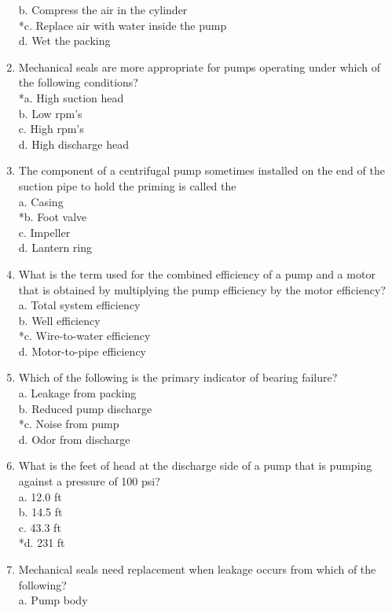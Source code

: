 \begin{enumerate}[1.]
b. Compress the air in the cylinder\\
*c. Replace air with water inside the pump\\
d. Wet the packing\\
\item Mechanical seals are more appropriate for pumps operating under which of the following conditions?\\
*a. High suction head\\
b. Low rpm's\\
c. High rpm's\\
d. High discharge head\\
\item The component of a centrifugal pump sometimes installed on the end of the suction pipe to hold the priming is called the\\
a. Casing\\
*b. Foot valve\\
c. Impeller\\
d. Lantern ring\\
\item What is the term used for the combined efficiency of a pump and a motor that is obtained by multiplying the pump efficiency by the motor efficiency?\\
a. Total system efficiency\\
b. Well efficiency\\
*c. Wire-to-water efficiency\\
d. Motor-to-pipe efficiency\\
\item Which of the following is the primary indicator of bearing failure?\\
a. Leakage from packing\\
b. Reduced pump discharge\\
*c. Noise from pump\\
d. Odor from discharge\\
\item What is the feet of head at the discharge side of a pump that is pumping against a pressure of 100 psi?\\
a. 12.0 ft\\
b. 14.5 ft\\
c. 43.3 ft\\
*d. 231 ft\\
\item Mechanical seals need replacement when leakage occurs from which of the following?\\
a. Pump body\\

\end{enumerate}
